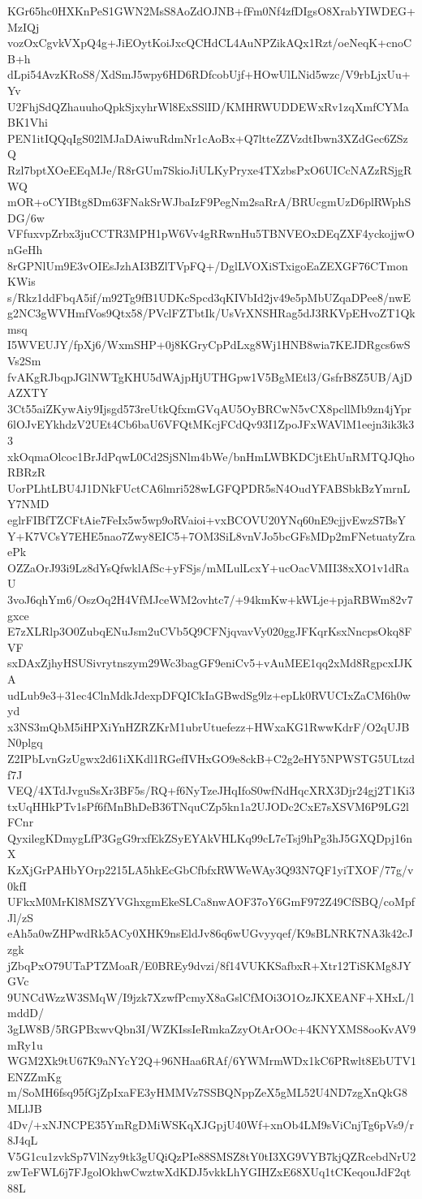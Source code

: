 KGr65hc0HXKnPeS1GWN2MsS8AoZdOJNB+fFm0Nf4zfDIgsO8XrabYIWDEG+MzIQj
vozOxCgvkVXpQ4g+JiEOytKoiJxcQCHdCL4AuNPZikAQx1Rzt/oeNeqK+cnoCB+h
dLpi54AvzKRoS8/XdSmJ5wpy6HD6RDfcobUjf+HOwUlLNid5wzc/V9rbLjxUu+Yv
U2FhjSdQZhauuhoQpkSjxyhrWl8ExSSlID/KMHRWUDDEWxRv1zqXmfCYMaBK1Vhi
PEN1itIQQqIgS02lMJaDAiwuRdmNr1cAoBx+Q7ltteZZVzdtIbwn3XZdGec6ZSzQ
Rzl7bptXOeEEqMJe/R8rGUm7SkioJiULKyPryxe4TXzbsPxO6UICcNAZzRSjgRWQ
mOR+oCYIBtg8Dm63FNakSrWJbaIzF9PegNm2saRrA/BRUcgmUzD6plRWphSDG/6w
VFfuxvpZrbx3juCCTR3MPH1pW6Vv4gRRwnHu5TBNVEOxDEqZXF4yckojjwOnGeHh
8rGPNlUm9E3vOIEsJzhAI3BZlTVpFQ+/DglLVOXiSTxigoEaZEXGF76CTmonKWis
s/Rkz1ddFbqA5if/m92Tg9fB1UDKcSpcd3qKIVbId2jv49e5pMbUZqaDPee8/nwE
g2NC3gWVHmfVos9Qtx58/PVclFZTbtIk/UsVrXNSHRag5dJ3RKVpEHvoZT1Qkmsq
I5WVEUJY/fpXj6/WxmSHP+0j8KGryCpPdLxg8Wj1HNB8wia7KEJDRgcs6wSVs2Sm
fvAKgRJbqpJGlNWTgKHU5dWAjpHjUTHGpw1V5BgMEtl3/GsfrB8Z5UB/AjDAZXTY
3Ct55aiZKywAiy9Ijsgd573reUtkQfxmGVqAU5OyBRCwN5vCX8pcllMb9zn4jYpr
6lOJvEYkhdzV2UEt4Cb6baU6VFQtMKcjFCdQv93I1ZpoJFxWAVlM1eejn3ik3k33
xkOqmaOlcoc1BrJdPqwL0Cd2SjSNlm4bWe/bnHmLWBKDCjtEhUnRMTQJQhoRBRzR
UorPLhtLBU4J1DNkFUctCA6lmri528wLGFQPDR5sN4OudYFABSbkBzYmrnLY7NMD
eglrFIBfTZCFtAie7FeIx5w5wp9oRVaioi+vxBCOVU20YNq60nE9cjjvEwzS7BsY
Y+K7VCsY7EHE5nao7Zwy8EIC5+7OM3SiL8vnVJo5bcGFsMDp2mFNetuatyZraePk
OZZaOrJ93i9Lz8dYsQfwklAfSc+yFSjs/mMLulLcxY+ucOacVMII38xXO1v1dRaU
3voJ6qhYm6/OszOq2H4VfMJceWM2ovhtc7/+94kmKw+kWLje+pjaRBWm82v7gxce
E7zXLRlp3O0ZubqENuJsm2uCVb5Q9CFNjqvavVy020ggJFKqrKsxNncpsOkq8FVF
sxDAxZjhyHSUSivrytnszym29Wc3bagGF9eniCv5+vAuMEE1qq2xMd8RgpcxIJKA
udLub9e3+31ec4ClnMdkJdexpDFQICkIaGBwdSg9lz+epLk0RVUCIxZaCM6h0wyd
x3NS3mQbM5iHPXiYnHZRZKrM1ubrUtuefezz+HWxaKG1RwwKdrF/O2qUJBN0plgq
Z2IPbLvnGzUgwx2d61iXKdl1RGefIVHxGO9e8ckB+C2g2eHY5NPWSTG5ULtzdf7J
VEQ/4XTdJvguSsXr3BF5s/RQ+f6NyTzeJHqIfoS0wfNdHqcXRX3Djr24gj2T1Ki3
txUqHHkPTv1sPf6fMnBhDeB36TNquCZp5kn1a2UJODc2CxE7sXSVM6P9LG2lFCnr
QyxilegKDmygLfP3GgG9rxfEkZSyEYAkVHLKq99cL7eTsj9hPg3hJ5GXQDpj16nX
KzXjGrPAHbYOrp2215LA5hkEcGbCfbfxRWWeWAy3Q93N7QF1yiTXOF/77g/v0kfI
UFkxM0MrKl8MSZYVGhxgmEkeSLCa8nwAOF37oY6GmF972Z49CfSBQ/coMpfJl/zS
eAh5a0wZHPwdRk5ACy0XHK9nsEldJv86q6wUGvyyqef/K9sBLNRK7NA3k42cJzgk
jZbqPxO79UTaPTZMoaR/E0BREy9dvzi/8f14VUKKSafbxR+Xtr12TiSKMg8JYGVc
9UNCdWzzW3SMqW/I9jzk7XzwfPcmyX8aGslCfMOi3O1OzJKXEANF+XHxL/lmddD/
3gLW8B/5RGPBxwvQbn3I/WZKIssIeRmkaZzyOtArOOc+4KNYXMS8ooKvAV9mRy1u
WGM2Xk9tU67K9aNYcY2Q+96NHaa6RAf/6YWMrmWDx1kC6PRwlt8EbUTV1ENZZmKg
m/SoMH6fsq95fGjZpIxaFE3yHMMVz7SSBQNppZeX5gML52U4ND7zgXnQkG8MLlJB
4Dv/+xNJNCPE35YmRgDMiWSKqXJGpjU40Wf+xnOb4LM9sViCnjTg6pVs9/r8J4qL
V5G1cu1zvkSp7VlNzy9tk3gUQiQzPIe88SMSZ8tY0tI3XG9VYB7kjQZRcebdNrU2
zwTeFWL6j7FJgolOkhwCwztwXdKDJ5vkkLhYGIHZxE68XUq1tCKeqouJdF2qt88L
